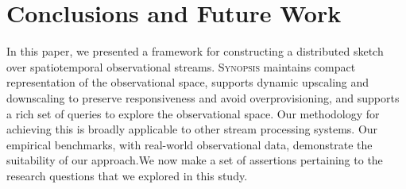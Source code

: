 \section{Conclusions and Future Work}
\label{sec:conclusions}
In this paper, we presented a framework for constructing a distributed sketch over spatiotemporal observational streams. \textsc{Synopsis} maintains compact representation of the observational space, supports dynamic upscaling and downscaling to preserve responsiveness and avoid overprovisioning, and supports a rich set of queries to explore the observational space. Our methodology for achieving this is broadly applicable to other stream processing systems.  Our empirical benchmarks, with real-world observational data, demonstrate the suitability of our approach.We now make a set of assertions pertaining to the research questions that we explored in this study.
